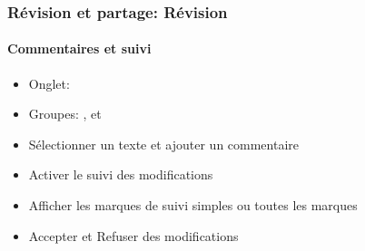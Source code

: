 \documentclass[xcolor=table]{beamer}
\begin{document}

\begin{frame}[t]
\frametitle{Révision et partage: Révision}
\framesubtitle{Commentaires et suivi}

\begin{minipage}{0.39\textwidth}
	\begin{itemize}
		\item Onglet: 
		\item Groupes: ,  et 
	\end{itemize}
\end{minipage}
\begin{minipage}{0.6\textwidth}
\end{minipage}

\begin{minipage}{0.69\textwidth}
	\begin{itemize}
		\item Sélectionner un texte et ajouter un commentaire 
		\item Activer le suivi des modifications
		\item Afficher les marques de suivi simples ou toutes les marques
		\item Accepter et Refuser des modifications
	\end{itemize}
\end{minipage}
\begin{minipage}{0.30\textwidth}
	
	
	
\end{minipage}

\end{frame}

\end{document}
